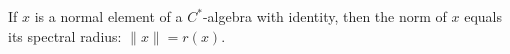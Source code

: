 If $x$ is a normal element of a $C^*$-algebra with identity, then the norm of $x$ equals its spectral radius: $\|x\| = r(x)$.
